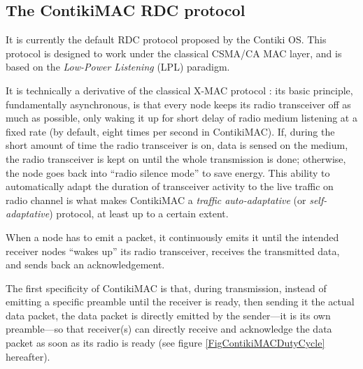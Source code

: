 \documentclass[conference]{IEEEtran}
\begin{document}
\subsection{The ContikiMAC RDC protocol}

It is currently the default RDC protocol proposed by the Contiki OS.
This protocol is designed to work under the classical CSMA/CA MAC layer,
and is based on the \emph{Low-Power Listening} (LPL) paradigm.

It is technically a derivative of the classical X-MAC protocol \cite{XMAC}:
its basic principle, fundamentally asynchronous, is that every node keeps
its radio transceiver off as much as possible, only waking it up for short
delay of radio medium listening at a fixed rate (by default, eight times
per second in ContikiMAC). If, during the short amount of time the radio
transceiver is on, data is sensed on the medium, the radio transceiver
is kept on until the whole transmission is done; otherwise, the node
goes back into ``radio silence mode'' to save energy.
This ability to automatically adapt the duration of transceiver activity
to the live traffic on radio channel is what makes ContikiMAC a
\emph{traffic auto-adaptative} (or \emph{self-adaptative}) protocol,
at least up to a certain extent.

When a node has to emit a packet, it continuously emits it until the
intended receiver nodes ``wakes up'' its radio transceiver, receives
the transmitted data, and sends back an acknowledgement.

The first specificity of ContikiMAC is that, during transmission, instead
of emitting a specific preamble until the receiver is ready, then sending
it the actual data packet, the data packet is directly emitted by the
sender---it is its own preamble---so that receiver(s) can directly receive
and acknowledge the data packet as soon as its radio is ready (see figure
\ref{FigContikiMACDutyCycle} hereafter).
\end{document}
